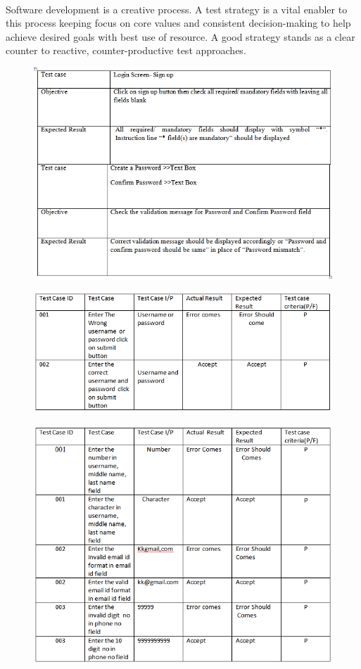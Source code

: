 \paragraph{}Software development is a creative process. A test strategy is a vital enabler to this process keeping focus on core values and consistent decision-making to help achieve desired goals with best use of resource. A good strategy stands as a clear counter to reactive, counter-productive test approaches.
\begin{figure}[!h]
	\centering
	\includegraphics[width = \textwidth]{./testc}
	
\end{figure}
\begin{figure}[!h]
	\centering
	\includegraphics[width = \textwidth]{./testc1}
	
\end{figure}
\begin{figure}[!h]
	\centering
	\includegraphics[width = \textwidth]{./testc2}
	
\end{figure}
